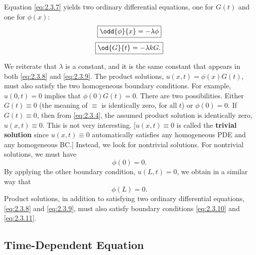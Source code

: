 Equation \eqref{eq:2.3.7} yields two ordinary differential equations, one for $G(t)$ and one for $\phi(x)$:
\begin{equation}
\label{eq:2.3.8}
\boxed{\odd{\phi}{x} = -\lambda\phi}
\end{equation}
\begin{equation}
\label{eq:2.3.9}
\boxed{\od{G}{t} = -\lambda k G.}
\end{equation}

We reiterate that $\lambda$ is a constant, and it is the same constant that appears in both \eqref{eq:2.3.8} and \eqref{eq:2.3.9}. The product solutions, $u(x,t) = \phi(x)G(t)$, must also satisfy the two homogeneous boundary conditions. For example, $u(0,t) = 0$ implies that $\phi(0)G(t) = 0$. There are two possibilities. Either $G(t) \equiv 0$ (the meaning of $\equiv$ is identically zero, for all $t$) or $\phi(0) = 0$. If $G(t) \equiv 0$, then from \eqref{eq:2.3.4}, the assumed product solution is identically zero, $u(x,t) \equiv 0$. This is not very interesting. [$u(x,t) \equiv 0$ is called the \textbf{trivial solution} since $u(x,t) \equiv 0$ automatically satisfies any homogeneous PDE and any homogeneous BC.] Instead, we look for nontrivial solutions. For nontrivial solutions, we must have
\begin{equation}
\label{eq:2.3.10}
\phi(0) = 0.
\end{equation}
By applying the other boundary condition, $u(L,t) = 0$, we obtain in a similar way that
\begin{equation}
\label{eq:2.3.11}
\phi(L) = 0.
\end{equation}
Product solutions, in addition to satisfying two ordinary differential equations, \eqref{eq:2.3.8} and \eqref{eq:2.3.9}, must also satisfy boundary conditions \eqref{eq:2.3.10} and \eqref{eq:2.3.11}.

\subsection{Time-Dependent Equation}
\label{sec:2.3.3}

